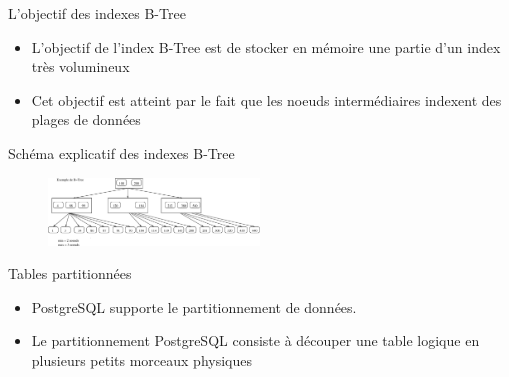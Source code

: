 \begin{frame}[fragile]{L'objectif des indexes B-Tree}

   \begin{itemize}
      \item L'objectif de l'index B-Tree est de stocker en mémoire une partie d'un index très volumineux
      \item Cet objectif est atteint par le fait que les noeuds intermédiaires indexent des plages de données
   \end{itemize}

\end{frame}


\begin{frame}[fragile]{Schéma explicatif des indexes B-Tree}

\begin{figure}
\begin{center}
\includegraphics[angle=0, width=0.5\textwidth]{images/b_tree.eps}
\end{center}
\end{figure}

\end{frame}


\begin{frame}[fragile]{Tables partitionnées}

   \begin{itemize}
      \item PostgreSQL supporte le partitionnement de données.
      \item Le partitionnement PostgreSQL consiste à découper une table logique en plusieurs petits morceaux physiques

   \end{itemize}

\begin{toile}
\end{toile}

\end{frame}

